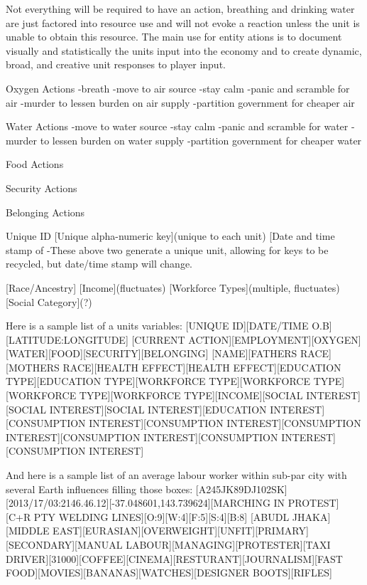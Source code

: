 Not everything will be required to have an action, breathing and drinking water are just factored into resource use and will not evoke a reaction unless the unit is unable to obtain this resource. The main use for entity ations is to document visually and statistically the units input into the economy and to create dynamic, broad, and creative unit responses to player input.

Oxygen Actions
-breath 
-move to air source
-stay calm
-panic and scramble for air
-murder to lessen burden on air supply
-partition government for cheaper air

Water Actions
-move to water source
-stay calm
-panic and scramble for water
-murder to lessen burden on water supply
-partition government for cheaper water


Food Actions



Security Actions



Belonging Actions




Unique ID
[Unique alpha-numeric key](unique to each unit)
[Date and time stamp of %
-These above two generate a unique unit, allowing for keys to be recycled, but date/time stamp will change.

[Race/Ancestry]
[Income](fluctuates)
[Workforce Types](multiple, fluctuates)
[Social Category](?)

Here is a sample list of a units variables:
[UNIQUE ID][DATE/TIME O.B][LATITUDE:LONGITUDE]
[CURRENT ACTION][EMPLOYMENT][OXYGEN][WATER][FOOD][SECURITY][BELONGING]
[NAME][FATHERS RACE][MOTHERS RACE][HEALTH EFFECT][HEALTH EFFECT][EDUCATION TYPE][EDUCATION TYPE][WORKFORCE TYPE][WORKFORCE TYPE]
[WORKFORCE TYPE][WORKFORCE TYPE][INCOME][SOCIAL INTEREST][SOCIAL INTEREST][SOCIAL INTEREST][EDUCATION INTEREST][CONSUMPTION INTEREST][CONSUMPTION INTEREST][CONSUMPTION INTEREST][CONSUMPTION INTEREST][CONSUMPTION INTEREST][CONSUMPTION INTEREST]

And here is a sample list of an average labour worker within sub-par city with several Earth influences filling those boxes:
[A245JK89DJ102SK][2013/17/03:2146.46.12][-37.048601,143.739624][MARCHING IN PROTEST][C+R PTY WELDING LINES][O:9][W:4][F:5][S:4][B:8]
[ABUDL JHAKA][MIDDLE EAST][EURASIAN][OVERWEIGHT][UNFIT][PRIMARY][SECONDARY][MANUAL LABOUR][MANAGING][PROTESTER][TAXI DRIVER][31000][COFFEE][CINEMA][RESTURANT][JOURNALISM][FAST FOOD][MOVIES][BANANAS][WATCHES][DESIGNER BOOTS][RIFLES]



